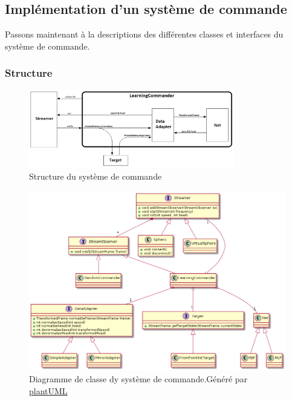 \subsection{Implémentation d'un système de commande}\label{sec:impcommander}
Passons maintenant à la descriptions des différentes classes et interfaces du système de commande.

\newcommand{\classname}[1]{\textbf{\texttt{#1}}}
\subsubsection{Structure}
\begin{figure}
 \centering
 \includegraphics[width=0.8\textwidth]{../figures/commander.jpg}
 \caption{Structure du système de commande}
 \label{fig:commander}
\end{figure}
\begin{figure}
 \centering
 \includegraphics[width=\textwidth]{../../uml/commanderdiag.png}
 \caption{Diagramme de classe dy système de commande.\footnotesize Généré par \href{http://plantuml.com/class-diagram}{plantUML}}
 \label{fig:commanderdiag}
\end{figure}

